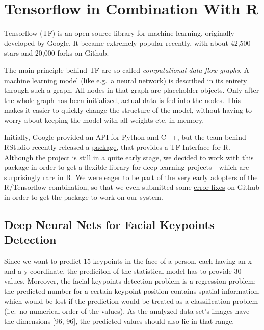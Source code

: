 \documentclass[]{article}
\begin{document}
\hypertarget{deep-neural-nets}{\section{Tensorflow in Combination With
R}\label{deep-neural-nets}}

Tensorflow (TF) is an open source library for machine learning,
originally developed by Google. It became extremely popular recently,
with about 42,500 stars and 20,000 forks on Github.

The main principle behind TF are so called \emph{computational data flow
graphs}. A machine learning model (like e.g.~a neural network) is
described in its enirety through such a graph. All nodes in that graph
are placeholder objects. Only after the whole graph has been
initialized, actual data is fed into the nodes. This makes it easier to
quickly change the structure of the model, without having to worry about
keeping the model with all weights etc. in memory.

Initially, Google provided an API for Python and C++, but the team
behind RStudio recently released a
\href{https://github.com/rstudio/tensorflow}{package}, that provides a
TF Interface for R. Although the project is still in a quite early
stage, we decided to work with this package in order to get a flexible
library for deep learning projects - which are surprisingly rare in R.
We were eager to be part of the very early adopters of the R/Tensorflow
combination, so that we even submitted some
\href{https://github.com/rstudio/tensorflow/issues/37}{error fixes} on
Github in order to get the package to work on our system.

\subsection{Deep Neural Nets for Facial Keypoints
Detection}\label{deep-neural-nets-for-facial-keypoints-detection}

Since we want to predict 15 keypoints in the face of a person, each
having an x- and a y-coordinate, the prediciton of the statistical model
has to provide 30 values. Moreover, the facial keypoints detection
problem is a regression problem: the predicted number for a certain
keypoint position contains spatial information, which would be lost if
the prediction would be treated as a classification problem (i.e.~no
numerical order of the values). As the analyzed data set's images have
the dimensions {[}96, 96{]}, the predicted values should also lie in
that range.
\end{document}
